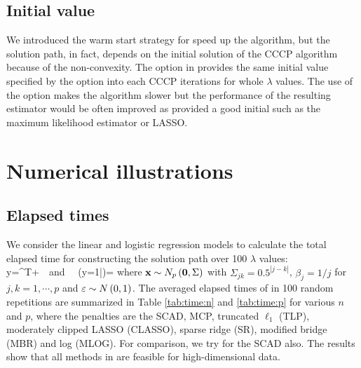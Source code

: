 \subsection{Initial value}
We introduced the warm start strategy for speed up the algorithm, but the solution path, in fact, depends on the initial solution of the CCCP algorithm because of the non-convexity.
The option  in  provides the same initial value specified by the option  into each CCCP iterations for whole $\lambda$ values.
The use of the option  makes the algorithm slower
but the performance of the resulting estimator would be often improved
as provided a good initial such as the maximum likelihood estimator or LASSO.



\section{Numerical illustrations}

\subsection{Elapsed times}
We consider the linear and logistic regression models to calculate the total elapsed time for constructing the solution path over 100 $\lambda$ values:
\beqn\label{exm:kwon}
     y=\bx^T\bbeta+\veps  ~~\mbox{and}~~ \pr\left(y=1|\bx\right)=
\eeqn
where ${\bf x} \sim N_p\left(\mathbf{0},\Sigma\right)$ with $\Sigma_{jk}=0.5^{|j-k|}$, $\beta_j=1/j$ for $j,k=1,\cdots,p$ and $\varepsilon \sim N\left(0,1\right)$.
The averaged elapsed times of  in 100 random repetitions are summarized in Table \ref{tab:time:n} and \ref{tab:time:p} for various $n$ and $p$,
where the penalties are the SCAD, MCP, truncated $\ell_1$ (TLP), moderately clipped LASSO (CLASSO), sparse ridge (SR), modified bridge (MBR) and log (MLOG).
For comparison, we try  for the SCAD also.
The results show that all methods in  are feasible for high-dimensional data.


